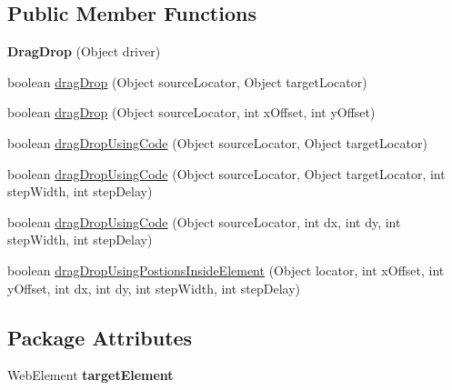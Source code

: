 \subsection*{Public Member Functions}
\begin{DoxyCompactItemize}
\item 
\hypertarget{classcom_1_1zeuslearning_1_1automation_1_1selenium_1_1interactions_1_1DragDrop_a36480d98e854e034499b7e94cb7e66ca}{}\label{classcom_1_1zeuslearning_1_1automation_1_1selenium_1_1interactions_1_1DragDrop_a36480d98e854e034499b7e94cb7e66ca} 
{\bfseries Drag\+Drop} (Object driver)
\item 
boolean \hyperlink{classcom_1_1zeuslearning_1_1automation_1_1selenium_1_1interactions_1_1DragDrop_a8919942768f1ab1278ae453a669460df}{drag\+Drop} (Object source\+Locator, Object target\+Locator)
\item 
boolean \hyperlink{classcom_1_1zeuslearning_1_1automation_1_1selenium_1_1interactions_1_1DragDrop_a94084c4d4b22a4970981f362ed7e9098}{drag\+Drop} (Object source\+Locator, int x\+Offset, int y\+Offset)
\item 
boolean \hyperlink{classcom_1_1zeuslearning_1_1automation_1_1selenium_1_1interactions_1_1DragDrop_acb4e035b12c5502ff045b5bede2e50d3}{drag\+Drop\+Using\+Code} (Object source\+Locator, Object target\+Locator)
\item 
boolean \hyperlink{classcom_1_1zeuslearning_1_1automation_1_1selenium_1_1interactions_1_1DragDrop_a02c5aee5ea424d0c247bff0c7e76dd97}{drag\+Drop\+Using\+Code} (Object source\+Locator, Object target\+Locator, int step\+Width, int step\+Delay)
\item 
boolean \hyperlink{classcom_1_1zeuslearning_1_1automation_1_1selenium_1_1interactions_1_1DragDrop_aa18fc7ffdb0ac0a5fe1c2772409fed7c}{drag\+Drop\+Using\+Code} (Object source\+Locator, int dx, int dy, int step\+Width, int step\+Delay)
\item 
boolean \hyperlink{classcom_1_1zeuslearning_1_1automation_1_1selenium_1_1interactions_1_1DragDrop_aee8499d8e1f457ecfc20724aaf9ea535}{drag\+Drop\+Using\+Postions\+Inside\+Element} (Object locator, int x\+Offset, int y\+Offset, int dx, int dy, int step\+Width, int step\+Delay)
\end{DoxyCompactItemize}
\subsection*{Package Attributes}
\begin{DoxyCompactItemize}
\item 
\hypertarget{classcom_1_1zeuslearning_1_1automation_1_1selenium_1_1interactions_1_1DragDrop_a60f88e71fac70a9f05d29556b3c21b7b}{}\label{classcom_1_1zeuslearning_1_1automation_1_1selenium_1_1interactions_1_1DragDrop_a60f88e71fac70a9f05d29556b3c21b7b} 
Web\+Element {\bfseries target\+Element}
\end{DoxyCompactItemize}
